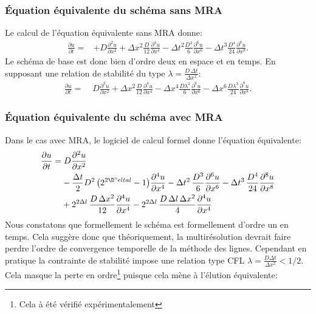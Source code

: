 \subsubsection{Équation équivalente du schéma sans MRA}
    Le calcul de l'équation équivalente sans MRA donne:
    \begin{align}
        \frac{\partial u}{\partial t}  =&+ D \frac{\partial^{2}u}{\partial x^{2}} 
        + \Delta x^{2} \frac{D}{12}             \frac{\partial^{4}u}{\partial x^{4}} 
        -  \Delta t^{2} \frac{D^{3}}{6}          \frac{\partial^{6}u}{\partial x^{6}} 
        -  \Delta t^{3} \frac{D^{4}}{24}        \frac{\partial^{8}u}{\partial x^{8}}.
    \end{align}
    Le schéma de base est donc bien d'ordre deux en espace et en temps.
    En supposant une relation de stabilité du type $\lambda = \frac{D\, \Delta t }{\Delta x^2}$:
    \begin{align}
        \frac{\partial u}{\partial t}  =&\; D \frac{\partial^{2}u}{\partial x^{2}} 
        + \Delta x^{2} \frac{D}{12}             \frac{\partial^{4}u}{\partial x^{4}}
        - \Delta x^{4} \frac{D \lambda^2}{6}     \frac{\partial^{6}u}{\partial x^{6}}
        - \Delta x^{6} \frac{D \lambda^3}{24}    \frac{\partial^{8}u}{\partial x^{8}}.
    \end{align}

\subsubsection{Équation équivalente du schéma avec MRA}
    Dans le cas avec MRA, le logiciel de calcul formel donne l'équation équivalente:
    \begin{align}
        \frac{\partial u}{\partial t} =&\; D \frac{\partial^2 u}{\partial x^2} \\\notag
        &- \frac{\Delta t}{2} D^2\, \bigl( 2^{2\D"elta l}- 1 \bigr)          \frac{\partial^4 u}{\partial x^4}
        - \Delta t^2\, \frac{D^3}{6}          \frac{\partial^6 u}{\partial x^6}
        - \Delta t^3\, \frac{D^4}{24}         \frac{\partial^8 u}{\partial x^8} \\\notag
        &+ 2^{2\Delta l}\, \frac{D\, \Delta x^2}{12}    \frac{\partial^4 u}{\partial x^4}
        - 2^{2\Delta l}\, \frac{D\, \Delta l\, \Delta x^2}{4} \frac{\partial^4 u}{\partial x^4}
    \end{align}
    Nous constatons que formellement le schéma est formellement d'ordre un en temps.
    Cela suggère donc que théoriquement, la multirésolution devrait faire perdre l'ordre de convergence temporelle de la méthode des lignes.
    Cependant en pratique la contrainte de stabilité impose une relation type CFL $\lambda = \frac{D \Delta t } {\Delta x^2} < 1/2$.
    Cela masque la perte en ordre\footnote{Cela à été vérifié expérimentalement} puisque cela mène à l’élution équivalente:

